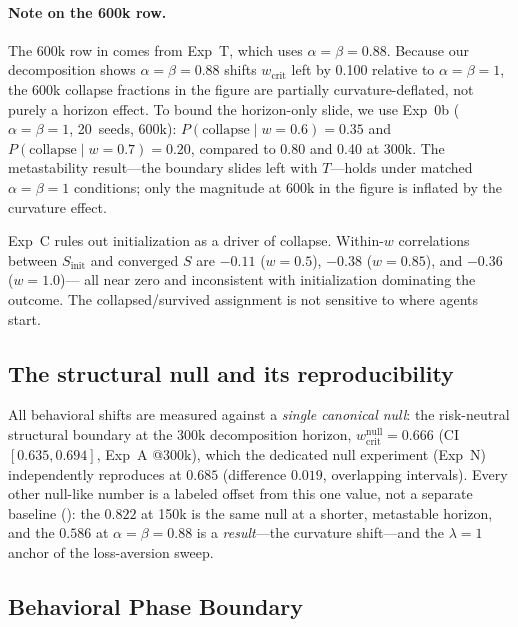 \documentclass[letterpaper]{article}
\theoremstyle{plain}
\newcommand{\wcrit}{w_{\mathrm{crit}}}
\begin{document}
\paragraph{Note on the 600k row.}
The 600k row in  comes from Exp~T, which uses
$\alpha{=}\beta{=}0.88$.
Because our decomposition shows $\alpha{=}\beta{=}0.88$ shifts
$\wcrit$ left by 0.100 relative to $\alpha{=}\beta{=}1$, the 600k
collapse fractions in the figure are partially curvature-deflated, not
purely a horizon effect.
To bound the horizon-only slide, we use Exp~0b ($\alpha{=}\beta{=}1$,
20~seeds, 600k): $P(\mathrm{collapse}\mid w{=}0.6) = 0.35$ and
$P(\mathrm{collapse}\mid w{=}0.7) = 0.20$, compared to 0.80 and 0.40
at 300k.
The metastability result---the boundary slides left with $T$---holds
under matched $\alpha{=}\beta{=}1$ conditions; only the magnitude at
600k in the figure is inflated by the curvature effect.

Exp~C rules out initialization as a driver of collapse.
Within-$w$ correlations between $S_{\mathrm{init}}$ and converged $S$
are $-0.11$ ($w{=}0.5$), $-0.38$ ($w{=}0.85$), and $-0.36$ ($w{=}1.0$)---
all near zero and inconsistent with initialization dominating the outcome.
The collapsed/survived assignment is not sensitive to where agents start.

\subsection{The structural null and its reproducibility}
\label{sec:results_null}

All behavioral shifts are measured against a \emph{single canonical null}: the
risk-neutral structural boundary at the 300k decomposition horizon,
$\wcrit^{\text{null}}=0.666$ (CI $[0.635,0.694]$, Exp~A @300k), which the
dedicated null experiment (Exp~N) independently reproduces at $0.685$
(difference $0.019$, overlapping intervals). Every other null-like number is a
labeled offset from this one value, not a separate baseline
(): the $0.822$ at 150k is the same null at a shorter,
metastable horizon, and the $0.586$ at $\alpha{=}\beta{=}0.88$ is a
\emph{result}---the curvature shift---and the $\lambda{=}1$ anchor of the
loss-aversion sweep.


\subsection{Behavioral Phase Boundary}
\label{sec:results_behavioral}
\end{document}
